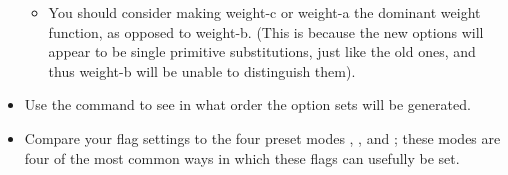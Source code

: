 \begin{itemize}
\begin{itemize}
\item You should consider making weight-c or weight-a the dominant weight function,
as opposed to weight-b.
(This is because the new options will appear to be single primitive substitutions, just like
the old ones, and thus weight-b will be unable to distinguish them).
\end{itemize}

\item Use the  command to see in what order the option sets will
be generated.

\item Compare your flag settings to the four preset modes , ,
 and ; these modes are four of the most common
ways in which these flags can usefully be set.
\end{itemize}

